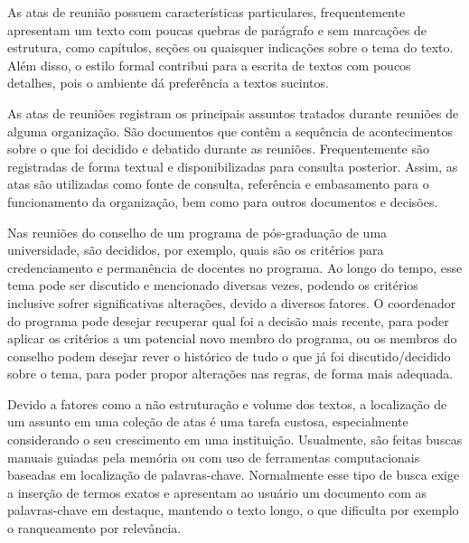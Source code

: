 

As atas de reunião possuem características particulares, frequentemente apresentam um texto com poucas quebras de parágrafo e sem marcações de estrutura, como capítulos, seções ou quaisquer indicações sobre o tema do texto. Além disso, o estilo formal contribui para a escrita de textos com poucos detalhes, pois o ambiente dá preferência a textos sucintos. 

As atas de reuniões registram os principais assuntos tratados durante reuniões de alguma organização. São documentos que contêm a sequência de acontecimentos sobre o que foi decidido e debatido durante as reuniões. Frequentemente são registradas de forma textual e disponibilizadas para consulta posterior. Assim, as atas são utilizadas como fonte de consulta, referência e embasamento para o funcionamento da organização, bem como para outros documentos e decisões.

















Nas reuniões do conselho de um programa de pós-graduação de uma universidade, são decididos, por exemplo, quais são os critérios para credenciamento e permanência de docentes no programa. Ao longo do tempo, esse tema pode ser discutido e mencionado diversas vezes, podendo os critérios inclusive sofrer significativas alterações, devido a diversos fatores. O coordenador do programa pode desejar recuperar qual foi a decisão mais recente, para poder aplicar os critérios a um potencial novo membro do programa, ou os membros do conselho podem desejar rever o histórico de tudo o que já foi discutido/decidido sobre o tema, para poder propor alterações nas regras, de forma mais adequada.




Devido a fatores como a não estruturação e volume dos textos, a localização de um assunto em uma coleção de atas é uma tarefa custosa, especialmente considerando o seu crescimento em uma instituição. Usualmente, são feitas buscas manuais guiadas pela memória ou com uso de ferramentas computacionais baseadas em localização de palavras-chave. Normalmente esse tipo de busca exige a inserção de termos exatos e apresentam ao usuário um documento com as palavras-chave em destaque, mantendo o texto longo, o que dificulta por exemplo o ranqueamento por relevância. 

